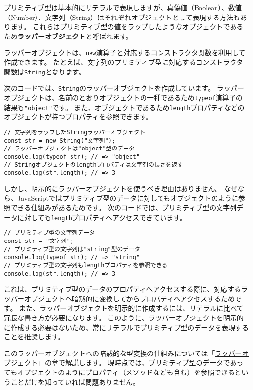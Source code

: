 プリミティブ型は基本的にリテラルで表現しますが、真偽値（Boolean）、数値（Number）、文字列（String）はそれぞれオブジェクトとして表現する方法もあります。
これらはプリミティブ型の値をラップしたようなオブジェクトであるため\textbf{ラッパーオブジェクト}と呼ばれます。

ラッパーオブジェクトは、\texttt{new}演算子と対応するコンストラクタ関数を利用して作成できます。
たとえば、文字列のプリミティブ型に対応するコンストラクタ関数は\texttt{String}となります。

次のコードでは、\texttt{String}のラッパーオブジェクトを作成しています。
ラッパーオブジェクトは、名前のとおりオブジェクトの一種であるため\texttt{typeof}演算子の結果も\texttt{"object"}です。
また、オブジェクトであるため\texttt{length}プロパティなどのオブジェクトが持つプロパティを参照できます。

\begin{lstlisting}
// 文字列をラップしたStringラッパーオブジェクト
const str = new String("文字列");
// ラッパーオブジェクトは"object"型のデータ
console.log(typeof str); // => "object"
// Stringオブジェクトのlengthプロパティは文字列の長さを返す
console.log(str.length); // => 3
\end{lstlisting}

しかし、明示的にラッパーオブジェクトを使うべき理由はありません。
なぜなら、JavaScriptではプリミティブ型のデータに対してもオブジェクトのように参照できる仕組みがあるためです。
次のコードでは、プリミティブ型の文字列データに対しても\texttt{length}プロパティへアクセスできています。

\begin{lstlisting}
// プリミティブ型の文字列データ
const str = "文字列";
// プリミティブ型の文字列は"string"型のデータ
console.log(typeof str); // => "string"
// プリミティブ型の文字列もlengthプロパティを参照できる
console.log(str.length); // => 3
\end{lstlisting}

これは、プリミティブ型のデータのプロパティへアクセスする際に、対応するラッパーオブジェクトへ暗黙的に変換してからプロパティへアクセスするためです。
また、ラッパーオブジェクトを明示的に作成するには、リテラルに比べて冗長な書き方が必要になります。
このように、ラッパーオブジェクトを明示的に作成する必要はないため、常にリテラルでプリミティブ型のデータを表現することを推奨します。

このラッパーオブジェクトへの暗黙的な型変換の仕組みについては「\hyperlink{wrapper-object}{ラッパーオブジェクト}」の章で解説します。
現時点では、プリミティブ型のデータであってもオブジェクトのようにプロパティ（メソッドなども含む）を参照できるということだけを知っていれば問題ありません。

